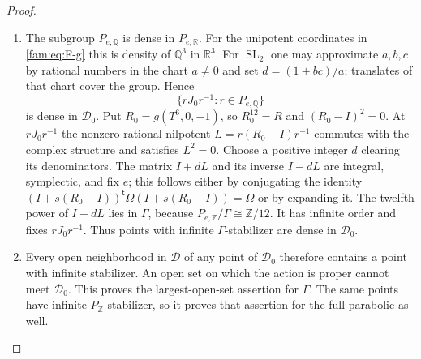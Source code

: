\begin{proof}
\begin{enumerate}[label=\arabic*.,leftmargin=*]
\item The subgroup $P_{e,\mathbb Q}$ is dense in $P_{e,\mathbb R}$.
For the unipotent coordinates in \eqref{fam:eq:F-g} this is density of
$\mathbb Q^3$ in $\mathbb R^3$.  For $\operatorname{SL}_2$ one may
approximate $a,b,c$ by rational numbers in the chart $a\ne0$ and set
$d=(1+bc)/a$; translates of that chart cover the group.  Hence
\[
 \{rJ_0r^{-1}:r\in P_{e,\mathbb Q}\}
\]
is dense in $\mathcal D_0$.
Put $R_0=g(T^6,0,-1)$, so $R_0^{12}=R$ and
$(R_0-I)^2=0$.  At $rJ_0r^{-1}$ the nonzero rational nilpotent
$L=r(R_0-I)r^{-1}$ commutes with the complex structure and satisfies
$L^2=0$.  Choose a positive integer $d$ clearing its denominators.
The matrix $I+dL$ and its inverse $I-dL$ are integral, symplectic, and
fix $e$; this follows either by conjugating the identity
$(I+s(R_0-I))^{\mathsf t}\Omega(I+s(R_0-I))=\Omega$ or by expanding it.
The twelfth power of $I+dL$ lies in $\Gamma$, because
$P_{e,\mathbb Z}/\Gamma\cong\mathbb Z/12$.  It has infinite order and
fixes $rJ_0r^{-1}$.  Thus points with infinite $\Gamma$-stabilizer are
dense in $\mathcal D_0$.

\item Every open neighborhood in $\mathcal D$ of any point of $\mathcal D_0$
therefore contains a point with infinite stabilizer.  An open set on
which the action is proper cannot meet $\mathcal D_0$.  This proves the
largest-open-set assertion for $\Gamma$.  The same points have infinite
$P_{\mathbb Z}$-stabilizer, so it proves that assertion for the full
parabolic as well.
\end{enumerate}
\end{proof}

